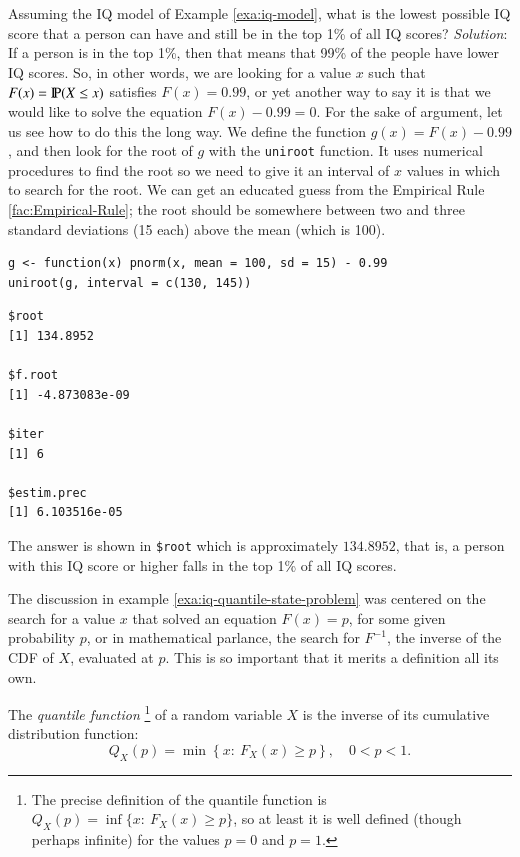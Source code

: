 \documentclass[captions=tableheading]{scrbook}
\begin{document}
\begin{example}
\label{exa:iq-quantile-state-problem}
Assuming the IQ model of Example \ref{exa:iq-model}, what is the lowest possible IQ score that a person can have and still be in the top 1\% of all IQ scores?
\emph{Solution}: If a person is in the top 1\%, then that means that 99\% of the people have lower IQ scores. So, in other words, we are looking for a value \(x\) such that \(F(x)=\P(X\leq x)\) satisfies \(F(x)=0.99\), or yet another way to say it is that we would like to solve the equation \(F(x)-0.99=0\). For the sake of argument, let us see how to do this the long way. We define the function \(g(x)=F(x)-0.99\), and then look for the root of \(g\) with the \texttt{uniroot} function. It uses numerical procedures to find the root so we need to give it an interval of \(x\) values in which to search for the root. We can get an educated guess from the Empirical Rule \ref{fac:Empirical-Rule}; the root should be somewhere between two and three standard deviations (15 each) above the mean (which is 100).

\begin{verbatim}
g <- function(x) pnorm(x, mean = 100, sd = 15) - 0.99
uniroot(g, interval = c(130, 145))
\end{verbatim}


\begin{verbatim}
$root
[1] 134.8952

$f.root
[1] -4.873083e-09

$iter
[1] 6

$estim.prec
[1] 6.103516e-05
\end{verbatim}



The answer is shown in \texttt{\$root} which is approximately \(  134.8952 \), that is, a person with this IQ score or higher falls in the top 1\% of all IQ scores.
\end{example}

The discussion in example \ref{exa:iq-quantile-state-problem} was centered on the search for a value \(x\) that solved an equation \(F(x)=p\), for some given probability \(p\), or in mathematical parlance, the search for \(F^{-1}\), the inverse of the CDF of \(X\), evaluated at \(p\). This is so important that it merits a definition all its own.

\begin{defn}
The \emph{quantile function}
\footnote{The precise definition of the quantile function is \(Q_{X}(p)=\inf \{ x:\ F_{X}(x)\geq p \}\), so at least it is well defined (though perhaps infinite) for the values \(p=0\) and \(p=1\).}
of a random variable \(X\) is the inverse of its cumulative distribution function:
\begin{equation}
Q_{X}(p)=\min\left\{ x:\ F_{X}(x)\geq p\right\} ,\quad0<p<1.
\end{equation}
\end{defn}
\end{document}
